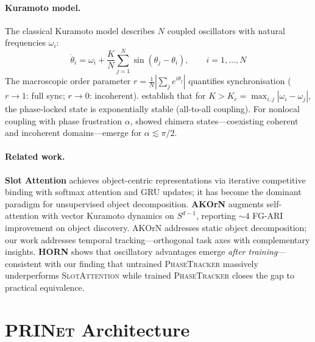 \documentclass[11pt]{article}
\providecommand{\prinet}{\textnormal{\textsc{PRINet}}\xspace}
\providecommand{\pt}{\textnormal{\textsc{PhaseTracker}}\xspace}
\providecommand{\sa}{\textnormal{\textsc{SlotAttention}}\xspace}
\begin{document}
\paragraph{Kuramoto model.}
The classical Kuramoto model describes $N$ coupled oscillators with
natural frequencies $\omega_i$:
\begin{equation}
  \dot{\theta}_i
  = \omega_i
  + \frac{K}{N} \sum_{j=1}^{N} \sin(\theta_j - \theta_i),
  \qquad i = 1, \ldots, N
  \label{eq:kuramoto}
\end{equation}
The macroscopic order parameter $r = \frac{1}{N}|\sum_j e^{i\theta_j}|$
quantifies synchronisation ($r \to 1$: full sync; $r \to 0$:
incoherent).  \citet{dorfler2014synchronization} establish that for
$K > K_c = \max_{i,j}|\omega_i - \omega_j|$, the phase-locked state is
exponentially stable (all-to-all coupling).  For nonlocal coupling with
phase frustration $\alpha$, \citet{abrams2004chimera} showed chimera
states---coexisting coherent and incoherent domains---emerge for
$\alpha \lesssim \pi/2$.

\paragraph{Related work.}
\textbf{Slot Attention} \citep{locatello2020object} achieves
object-centric representations via iterative competitive binding with
softmax attention and GRU updates; it has become the dominant paradigm
for unsupervised object decomposition.
\textbf{AKOrN} \citep{miyato2025akorn} augments self-attention with
vector Kuramoto dynamics on $S^{d-1}$, reporting ${\sim}4$ FG-ARI
improvement on object discovery.  AKOrN addresses static object
decomposition; our work addresses temporal tracking---orthogonal task
axes with complementary insights.
\textbf{HORN} \citep{engelken2025horn} shows that oscillatory
advantages emerge \emph{after training}---consistent with our finding
that untrained \pt massively underperforms \sa while trained \pt
closes the gap to practical equivalence.

\section{\prinet Architecture}
\label{sec:architecture}
\end{document}
